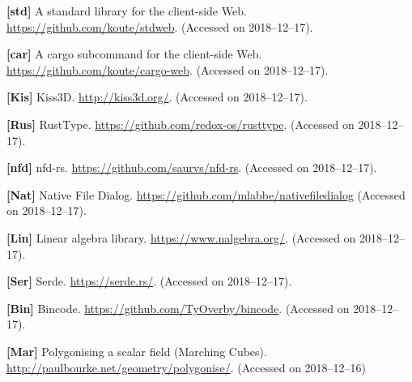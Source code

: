 \documentclass{article}
\begin{document}
\textbf{[std]}\label{ref:std}
A standard library for the client-side Web. \url{https://github.com/koute/stdweb}. (Accessed on 2018--12--17).

\textbf{[car]}\label{ref:car}
A cargo subcommand for the client-side Web. \url{https://github.com/koute/cargo-web}. (Accessed on 2018--12--17).

\textbf{[Kis]}\label{ref:Kis}
Kiss3D. \url{http://kiss3d.org/}. (Accessed on 2018--12--17).

\textbf{[Rus]}\label{ref:Rus}
RustType. \url{https://github.com/redox-os/rusttype}. (Accessed on 2018--12--17).

\textbf{[nfd]}\label{ref:nfd}
nfd-rs. \url{https://github.com/saurvs/nfd-rs}. (Accessed on 2018--12--17).

\textbf{[Nat]}\label{ref:Nat}
Native File Dialog. \url{https://github.com/mlabbe/nativefiledialog} (Accessed on 2018--12--17).

\textbf{[Lin]}\label{ref:Lin}
Linear algebra library. \url{https://www.nalgebra.org/}. (Accessed on 2018--12--17).

\textbf{[Ser]}\label{ref:Ser}
Serde. \url{https://serde.rs/}. (Accessed on 2018--12--17).

\textbf{[Bin]}\label{ref:Bin}
Bincode. \url{https://github.com/TyOverby/bincode}. (Accessed on 2018--12--17).

\textbf{[Mar]}\label{ref:Mar}
Polygonising a scalar field (Marching Cubes). \url{http://paulbourke.net/geometry/polygonise/}. (Accessed on 2018--12--16)
\end{document}
